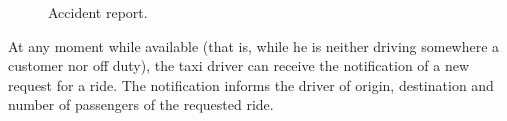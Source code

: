 \begin{figure}%
	\centering%
	\caption{Accident report.}\label{fig:accidentReport}%
\end{figure}

At any moment while available (that is, while he is neither driving somewhere a customer nor off duty), the taxi driver can receive the notification of a new request for a ride. The notification informs the driver of origin, destination and number of passengers of the requested ride.

